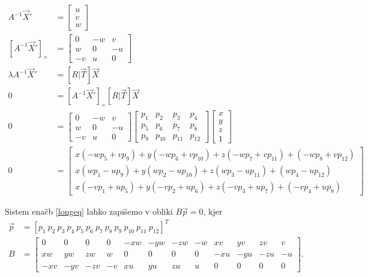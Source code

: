 \documentclass[a4paper, 12pt]{book}
\begin{document}
\begin{align}
\label{uvw}
A^{-1} \vec{X}' &=
\begin{bmatrix}
u \\
v \\
w
\end{bmatrix} \\
[A^{-1} \vec{X}']_{\times} &=
\begin{bmatrix}
0 & -w & v \\
w & 0 & -u \\
-v & u & 0
\end{bmatrix} \\[5ex]
\lambda A^{-1} \vec{X}' &= [R | \vec{T}] \vec{X} \\
0 &= [A^{-1} \vec{X}']_{\times} [R | \vec{T}] \vec{X}\\
0 &= 
\begin{bmatrix}
0 & -w & v \\
w & 0 & -u \\
-v & u & 0
\end{bmatrix}
\begin{bmatrix}
p_1 & p_2 & p_3 & p_4 \\
p_5 & p_6 & p_7 & p_8 \\
p_9 & p_{10} & p_{11} & p_{12}
\end{bmatrix}
\begin{bmatrix}
x \\
y \\
z \\
1
\end{bmatrix} \\
0 &= 
\begin{bmatrix}
x(-wp_5 + vp_9) + y(-wp_6 + vp_{10}) + z(-wp_7 + vp_{11}) + (-wp_8 + vp_{12}) \\
x(wp_1 - up_9) + y(wp_2 - up_{10}) + z(wp_3 - up_{11}) + (wp_4 - up_{12}) \\
x(-vp_1 + up_5) + y(-vp_2 + up_6) + z(-vp_3 + up_7) + (-vp_4 + up_8)
\end{bmatrix}
\label{longeq}
\end{align}

\setcounter{MaxMatrixCols}{20}
Sistem enačb \eqref{longeq} lahko zapišemo v obliki $B \vec{p} = 0$, kjer
\begin{align}
\vec{p} &= [p_1 \ p_2 \ p_3 \ p_4 \ p_5 \ p_6 \ p_7 \ p_8 \ p_9 \ p_{10} \ p_{11} \ p_{12}]^T \\
B &=
\begin{bmatrix}
0 & 0 & 0 & 0 & -xw & -yw & -zw & -w & xv & yv & zv & v \\
xw & yw & zw & w & 0 & 0 & 0 & 0 & -xu & -yu & -zu & -u \\
-xv & -yv & -zv & -v & xu & yu & zu & u & 0 & 0 & 0 & 0
\end{bmatrix}.
\label{bmatrix}
\end{align}
\end{document}
